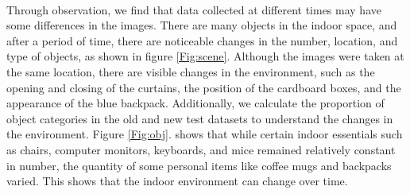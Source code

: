\documentclass[a4paper,12pt]{report}
\begin{document}
\paragraph{}
Through observation, we find that data collected at different times may have some differences in the images. There are many objects in the indoor space, and after a period of time, there are noticeable changes in the number, location, and type of objects, as shown in figure \ref{Fig:scene}. Although the images were taken at the same location, there are visible changes in the environment, such as the opening and closing of the curtains, the position of the cardboard boxes, and the appearance of the blue backpack. Additionally, we calculate the proportion of object categories in the old and new test datasets to understand the changes in the environment. Figure \ref{Fig:obj}. shows that while certain indoor essentials such as chairs, computer monitors, keyboards, and mice remained relatively constant in number, the quantity of some personal items like coffee mugs and backpacks varied. This shows that the indoor environment can change over time.
\end{document}
